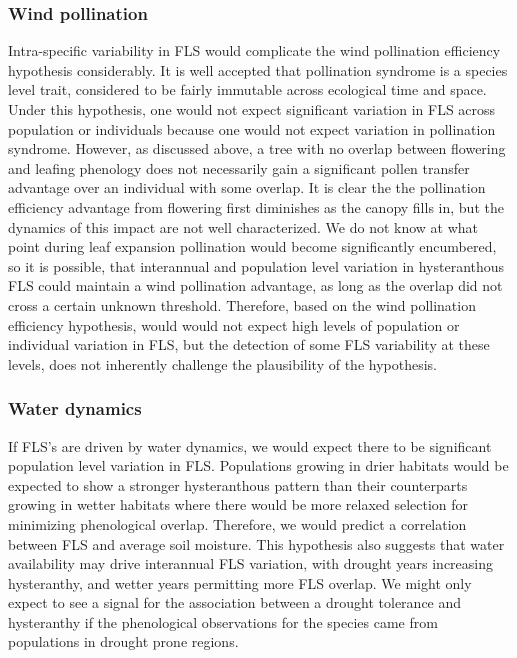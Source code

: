 \documentclass[12pt]{article}\usepackage[]{graphicx}\usepackage[]{color}
\begin{document}
\subsubsection*{Wind pollination} 
\indent\indent Intra-specific variability in FLS would complicate the wind pollination efficiency hypothesis considerably.  It is well accepted that pollination syndrome is a species level trait, considered to be fairly immutable across ecological time and space. Under this hypothesis, one would not expect significant variation in FLS across population or individuals because one would not expect variation in pollination syndrome. However, as discussed above, a tree with no overlap between flowering and leafing phenology does not necessarily gain a significant pollen transfer advantage over an individual with some overlap. It is clear the the pollination efficiency advantage from flowering first diminishes as the canopy fills in, but the dynamics of this impact are not well characterized. We do not know at what point during leaf expansion pollination would become significantly encumbered, so it is possible, that interannual and population level variation in hysteranthous FLS could maintain a wind pollination advantage, as long as the overlap did not cross a certain unknown threshold. Therefore, based on the wind pollination efficiency hypothesis, would would not expect high levels of population or individual variation in FLS, but the detection of some FLS variability at these levels, does not inherently challenge the plausibility of the hypothesis. %
\subsubsection*{Water dynamics} 
\indent\indent If FLS's are driven by water dynamics, we would expect there to be significant population level variation in FLS. Populations growing in drier habitats would be expected to show a stronger hysteranthous pattern than their counterparts growing in wetter habitats where there would be more relaxed selection for minimizing phenological overlap. Therefore, we would predict a correlation between FLS and average soil moisture. This hypothesis also suggests that water availability may drive interannual FLS variation, with drought years increasing hysteranthy, and wetter years permitting more FLS overlap. We might only expect to see a signal for the association between a drought tolerance and hysteranthy if the phenological observations for the species came from populations in drought prone regions. 
\end{document}
